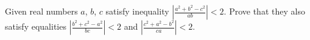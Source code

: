 Given real numbers $a$, $b$, $c$ satisfy inequality $\left| \frac{a^2+b^2-c^2}{ab} \right|<2$. Prove that they also satisfy equalities $\left| \frac{b^2+c^2-a^2}{bc} \right|<2$ and $\left|  \frac{c^2+a^2-b^2}{ca} \right| <2$.